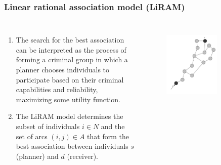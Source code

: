 \documentclass[aspectratio=169]{beamer}
\begin{document}
\begin{frame}
\frametitle{Linear rational association model (LiRAM)}
  \begin{columns}
    \begin{enumerate}
      \item<1-> The search for the best association can be interpreted as the process of forming a criminal group in which a planner chooses individuals to participate based on their criminal capabilities and reliability, maximizing some utility function.
      \item<2-> The LiRAM model determines the subset of individuals $i \in N$ and the set of arcs $(i,j) \in A$ that form the best association between individuals $s$ (planner) and $d$ (receiver).
    \end{enumerate}
    \begin{figure}[ht]
      \centering
       {\includegraphics[width=0.7\textwidth]{images/liram-1.pdf}}%
    \end{figure}
  \end{columns}
\end{frame}
\end{document}
